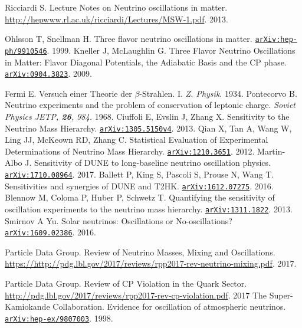 \begin{thebibliography}{100}
	 Ricciardi S. Lecture Notes on Neutrino oscillations in
		matter.
		\url{http://hepwww.rl.ac.uk/ricciardi/Lectures/MSW-1.pdf}. 2013.

	 Ohlsson T, Snellman H. Three flavor neutrino oscillations
		in matter.
		\href{https://arxiv.org/abs/hep-ph/9910546v4}{\texttt{arXiv:hep-ph/9910546}}. 1999.
	 Kneller J, McLaughlin G. Three Flavor Neutrino Oscillations
		in Matter: Flavor Diagonal Potentials, the Adiabatic Basis and the CP
		phase. \href{https://arxiv.org/abs/0904.3823}{\texttt{arXiv:0904.3823}}. 2009.

	 Fermi E. Versuch einer Theorie der $\beta$-Strahlen. I.
		\textit{Z. Physik}. 1934.
	 Pontecorvo B. Neutrino experiments and the problem of
		conservation of leptonic charge. \textit{Soviet Physics JETP, \textbf{26},
		984.} 1968.
	 Ciuffoli E, Evslin J, Zhang X. Sensitivity to the
		Neutrino Mass Hierarchy.
		\href{https://arxiv.org/abs/1305.5150v4}{\texttt{arXiv:1305.5150v4}}. 2013.
	 Qian X, Tan A, Wang W, Ling JJ, McKeown RD, Zhang C.
		Statistical Evaluation of Experimental Determinations of Neutrino Mass
		Hierarchy.
		\href{https://arxiv.org/abs/1210.3651}{\texttt{arXiv:1210.3651}}. 2012.
	 Martin-Albo J. Sensitivity of DUNE to long-baseline
		neutrino oscillation physics.
		\href{https://arxiv.org/abs/1710.08964}{\texttt{arXiv:1710.08964}}. 2017.
	 Ballett P, King S, Pascoli S, Prouse N, Wang T.
		Sensitivities and synergies of DUNE and T2HK. \href{
			https://arxiv.org/pdf/1612.07275.pdf}{\texttt{arXiv:1612.07275}}. 2016.
	 Blennow M, Coloma P, Huber P, Schwetz T. Quantifying the
		sensitivity of oscillation experiments to the neutrino mass hierarchy.
		\href{https://arxiv.org/pdf/1311.1822.pdf}{\texttt{arXiv:1311.1822}}. 2013.
	 Smirnov A Yu. Solar neutrinos: Oscillations or
		No-oscillations?
		\href{https://arxiv.org/abs/1609.02386}{\texttt{arXiv:1609.02386}}. 2016.

	 Particle Data Group. Review of Neutrino Masses, Mixing and
		Oscillations.
		\url{https://http://pdg.lbl.gov/2017/reviews/rpp2017-rev-neutrino-mixing.pdf}.
		2017.

	 Particle Data Group. Review of CP Violation in the Quark Sector.
		\url{http://pdg.lbl.gov/2017/reviews/rpp2017-rev-cp-violation.pdf}. 2017
	 The Super-Kamiokande Collaboration. Evidence for oscillation
		of atmospheric neutrinos.
		\href{https://arxiv.org/abs/hep-ex/9807003}{\texttt{arXiv:hep-ex/9807003}}. 1998.


\end{thebibliography}
